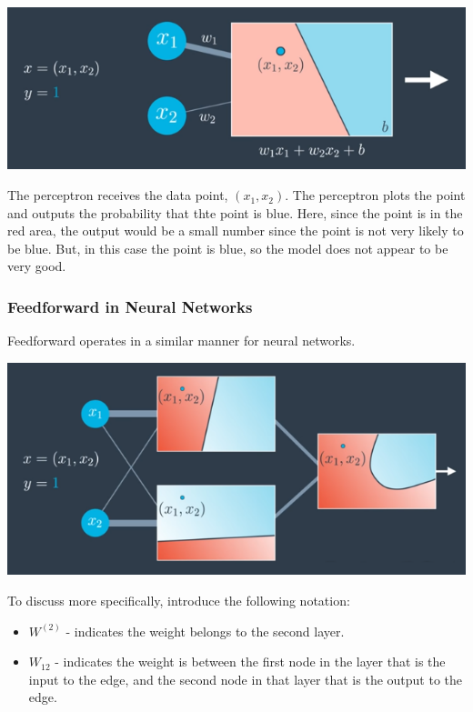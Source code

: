 \includegraphics[width=1\linewidth]{img//intro//introNN/neural-network-architecture-16.png}

The perceptron receives the data point, \((x_1, x_2)\). The perceptron plots the point and outputs the probability that thte point is blue. Here, since the point is in the red area, the output would be a small number since the point is not very likely to be blue. But, in this case the point is blue, so the model does not appear to be very good.

\subsubsection{Feedforward in Neural Networks}
Feedforward operates in a similar manner for neural networks.

\includegraphics[width=1\linewidth]{img//intro//introNN/neural-network-architecture-17.png}

To discuss more specifically, introduce the following notation:
\begin{itemize}
    \item \(W^{(2)}\) - indicates the weight belongs to the second layer.
    \item \(W_{12}\) - indicates the weight is between the first node in the layer that is the input to the edge, and the second node in that layer that is the output to the edge.
\end{itemize}

